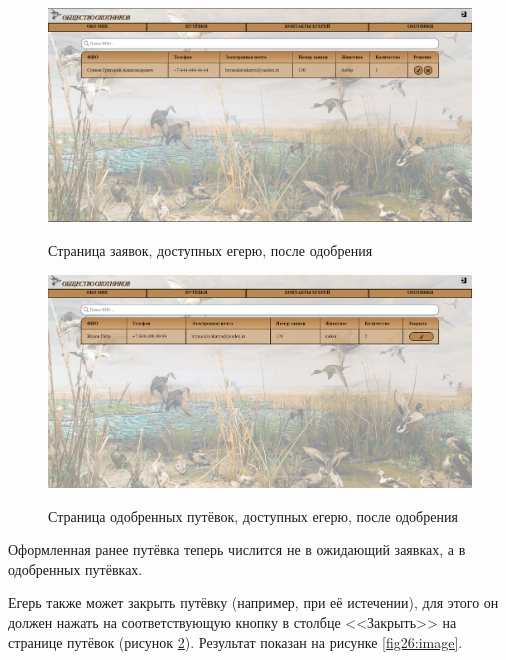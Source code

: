	\begin{figure}[h]
		\centering
		\begin{center}
			{\includegraphics[scale=0.34]{schemes/screens/requests_huntsman_add.png}}
			\caption{Страница заявок, доступных егерю, после одобрения}
			\label{fig24:image}
		\end{center}
	\end{figure} 

	\begin{figure}[pt!]
		\centering
		\begin{center}
			{\includegraphics[scale=0.34]{schemes/screens/vouchers_huntsman_add.png}}
			\caption{Страница одобренных путёвок, доступных егерю, после одобрения}
			\label{fig25:image}
		\end{center}
	\end{figure} 
	\newpage

	Оформленная ранее путёвка теперь числится не в ожидающий заявках, а в одобренных путёвках.
	
	Егерь также может закрыть путёвку (например, при её истечении), для этого он должен нажать на соответствующую кнопку в столбце <<Закрыть>> на странице путёвок (рисунок \ref{fig25:image}). Результат показан на рисунке \ref{fig26:image}.
	
